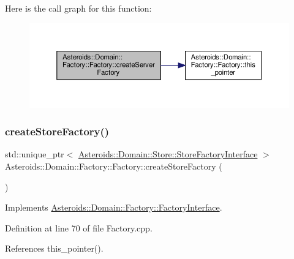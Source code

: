 Here is the call graph for this function\+:\nopagebreak
\begin{figure}[H]
\begin{center}
\leavevmode
\includegraphics[width=350pt]{classAsteroids_1_1Domain_1_1Factory_1_1Factory_a7d3fd1dd5d6f0e44de2b4a57985b623b_cgraph}
\end{center}
\end{figure}
\mbox{\label{classAsteroids_1_1Domain_1_1Factory_1_1Factory_abc6cc7d441ceeca66671c79cff1e0c99}} 
\subsubsection{\texorpdfstring{create\+Store\+Factory()}{createStoreFactory()}}
{\footnotesize\ttfamily std\+::unique\+\_\+ptr$<$ \hyperlink{classAsteroids_1_1Domain_1_1Store_1_1StoreFactoryInterface}{Asteroids\+::\+Domain\+::\+Store\+::\+Store\+Factory\+Interface} $>$ Asteroids\+::\+Domain\+::\+Factory\+::\+Factory\+::create\+Store\+Factory (\begin{DoxyParamCaption}{ }\end{DoxyParamCaption})\hspace{0.3cm}{\ttfamily [virtual]}}



Implements \hyperlink{classAsteroids_1_1Domain_1_1Factory_1_1FactoryInterface_ae658038784c7e05435350f631f5e1924}{Asteroids\+::\+Domain\+::\+Factory\+::\+Factory\+Interface}.



Definition at line 70 of file Factory.\+cpp.



References this\+\_\+pointer().

